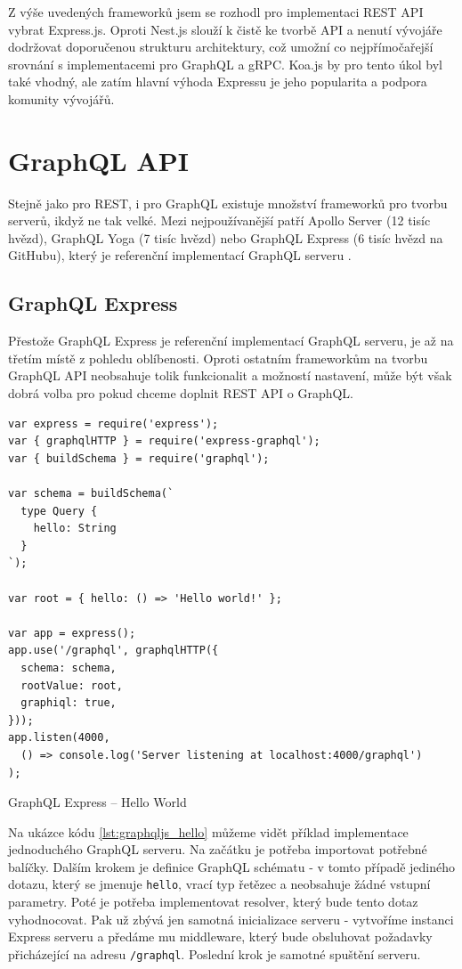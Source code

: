 \documentclass[thesis=M,czech]{FITthesis}[2019/12/23]
\begin{document}
Z výše uvedených frameworků jsem se rozhodl pro implementaci REST API vybrat Express.js. Oproti Nest.js slouží k čistě ke tvorbě API a nenutí vývojáře  dodržovat doporučenou strukturu architektury, což umožní co nejpřímočařejší srovnání s implementacemi pro GraphQL a gRPC. Koa.js by pro tento úkol byl také vhodný, ale zatím hlavní výhoda Expressu je jeho popularita a podpora komunity vývojářů.

\section{GraphQL API}
Stejně jako pro REST, i pro GraphQL existuje množství frameworků pro tvorbu serverů, ikdyž ne tak velké. Mezi nejpoužívanější patří Apollo Server (12 tisíc hvězd), GraphQL Yoga (7 tisíc hvězd) nebo GraphQL Express (6 tisíc hvězd na GitHubu), který je referenční implementací GraphQL serveru \cite{graphql_libraries}.

\subsection*{GraphQL Express}
Přestože GraphQL Express je referenční implementací GraphQL serveru, je až na třetím místě z pohledu oblíbenosti. Oproti ostatním frameworkům na tvorbu GraphQL API neobsahuje tolik funkcionalit a možností nastavení, může být však dobrá volba pro pokud chceme doplnit REST API o GraphQL.

\begin{listing}[H]
\begin{verbatim}
var express = require('express');
var { graphqlHTTP } = require('express-graphql');
var { buildSchema } = require('graphql');

var schema = buildSchema(`
  type Query {
    hello: String
  }
`);

var root = { hello: () => 'Hello world!' };

var app = express();
app.use('/graphql', graphqlHTTP({
  schema: schema,
  rootValue: root,
  graphiql: true,
}));
app.listen(4000, 
  () => console.log('Server listening at localhost:4000/graphql')
);
\end{verbatim}
\caption{GraphQL Express -- Hello World}
\label{lst:graphqljs_hello}
\end{listing}

Na ukázce kódu \ref{lst:graphqljs_hello} můžeme vidět příklad implementace jednoduchého GraphQL serveru. Na začátku je potřeba importovat potřebné balíčky. Dalším krokem je definice GraphQL schématu - v tomto případě jediného dotazu, který se jmenuje \texttt{hello}, vrací typ řetězec a neobsahuje žádné vstupní parametry. Poté je potřeba implementovat resolver, který bude tento dotaz vyhodnocovat. Pak už zbývá jen samotná inicializace serveru - vytvoříme instanci Express serveru a předáme mu middleware, který bude obsluhovat požadavky přicházející na adresu \texttt{/graphql}. Poslední krok je samotné spuštění serveru.
\end{document}
